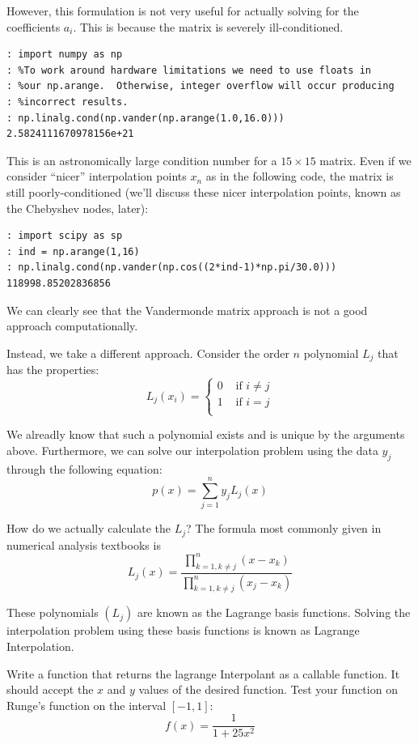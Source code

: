 However, this formulation is not very useful for actually solving for the coefficients $a_i$. This is because the matrix is severely ill-conditioned.

\begin{lstlisting}[style=python]
: import numpy as np
: %To work around hardware limitations we need to use floats in
: %our np.arange.  Otherwise, integer overflow will occur producing
: %incorrect results.
: np.linalg.cond(np.vander(np.arange(1.0,16.0)))
2.5824111670978156e+21
\end{lstlisting}

This is an astronomically large condition number for a $15 \times 15$ matrix. Even if we consider ``nicer'' interpolation points $x_n$ as in the following code, the matrix is still poorly-conditioned (we'll discuss these nicer interpolation points, known as the Chebyshev nodes, later):

\begin{lstlisting}[style=python]
: import scipy as sp
: ind = np.arange(1,16)
: np.linalg.cond(np.vander(np.cos((2*ind-1)*np.pi/30.0)))
118998.85202836856
\end{lstlisting}

We can clearly see that the Vandermonde matrix approach is not a good approach computationally.

Instead, we take a different approach. Consider the order $n$ polynomial $L_j$ that has the properties:
\[
L_j(x_i) = \begin{cases} 0 &\mbox{ if } i \neq j\\ 1 &\mbox{ if } i =j \\ \end{cases}
\]

We alreadly know that such a polynomial exists and is unique by the arguments above. Furthermore, we can solve our interpolation problem using the data $y_j$ through the following equation:
\[
p(x) = \sum_{j=1}^n y_j L_j(x)
\]

How do we actually calculate the $L_j$? The formula most commonly given in numerical analysis textbooks is
\[
L_j(x) = \frac{\displaystyle\prod_{k=1, k \neq j}^n (x-x_k)}{\displaystyle\prod_{k=1, k \neq j}^n (x_j-x_k)}
\]

These polynomials $(L_j)$ are known as the Lagrange basis functions. Solving the interpolation problem using these basis functions is known as Lagrange Interpolation.

\begin{problem}
Write a function that returns the lagrange Interpolant as a callable function. It should accept the $x$ and $y$ values of the desired function. Test your function on Runge's function on the interval $[-1,1]$:
\[
f(x) = \frac{1}{1+25x^2}
\]
\end{problem}

